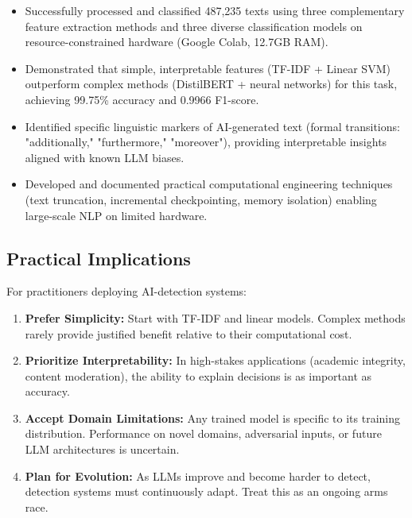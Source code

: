 \documentclass[12pt, a4paper]{article}
\begin{document}
\begin{itemize}
    \item Successfully processed and classified 487,235 texts using three complementary feature extraction methods and three diverse classification models on resource-constrained hardware (Google Colab, 12.7GB RAM).
    
    \item Demonstrated that simple, interpretable features (TF-IDF + Linear SVM) outperform complex methods (DistilBERT + neural networks) for this task, achieving 99.75\% accuracy and 0.9966 F1-score.
    
    \item Identified specific linguistic markers of AI-generated text (formal transitions: "additionally," "furthermore," "moreover"), providing interpretable insights aligned with known LLM biases.
    
    \item Developed and documented practical computational engineering techniques (text truncation, incremental checkpointing, memory isolation) enabling large-scale NLP on limited hardware.
\end{itemize}

\subsection{Practical Implications}

For practitioners deploying AI-detection systems:

\begin{enumerate}
    \item \textbf{Prefer Simplicity:} Start with TF-IDF and linear models. Complex methods rarely provide justified benefit relative to their computational cost.
    
    \item \textbf{Prioritize Interpretability:} In high-stakes applications (academic integrity, content moderation), the ability to explain decisions is as important as accuracy.
    
    \item \textbf{Accept Domain Limitations:} Any trained model is specific to its training distribution. Performance on novel domains, adversarial inputs, or future LLM architectures is uncertain.
    
    \item \textbf{Plan for Evolution:} As LLMs improve and become harder to detect, detection systems must continuously adapt. Treat this as an ongoing arms race.
\end{enumerate}
\end{document}
